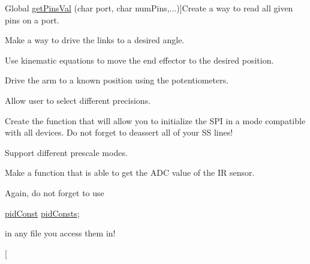 \begin{DoxyRefList}
\hypertarget{todo__todo000017}{}%
Global \hyperlink{ports_8c_ab7026077c8929553713b2884b1730e7a}{get\-Pins\-Val} (char port, char num\-Pins,...)]Create a way to read all given pins on a port.  
\item[\label{todo__todo000006}%
\hypertarget{todo__todo000006}{}%
Global \hyperlink{motors_8h_af29dc743a43c233ac843475727db132f}{goto\-Angles} (int lower\-Theta, int upper\-Theta)]Make a way to drive the links to a desired angle.  
\item[\label{todo__todo000007}%
\hypertarget{todo__todo000007}{}%
Global \hyperlink{motors_8h_aa294b49bfcc17cf4b490fb020e359851}{goto\-X\-Y} (int x, int y)]Use kinematic equations to move the end effector to the desired position.  
\item[\label{todo__todo000009}%
\hypertarget{todo__todo000009}{}%
Global \hyperlink{motors_8h_a946fb06843f118c8abacd3aef032584c}{home\-Pos} ()]Drive the arm to a known position using the potentiometers.  
\item[\label{todo__todo000001}%
\hypertarget{todo__todo000001}{}%
Global \hyperlink{_a_d_c_8c_a9c2a3351c429e7ad5ed4458495f56852}{init\-A\-D\-C} (int channel, int free, int interrupts)]Allow user to select different precisions.  
\item[\label{todo__todo000019}%
\hypertarget{todo__todo000019}{}%
Global \hyperlink{_s_p_i_8c_a070402cc6c1cae693d10f59f9c483f76}{init\-S\-P\-I} ()]Create the function that will allow you to initialize the S\-P\-I in a mode compatible with all devices. Do not forget to deassert all of your S\-S lines!  
\item[\label{todo__todo000021}%
\hypertarget{todo__todo000021}{}%
Global \hyperlink{timer_8c_a656bb5d0e209ac041910cbdbf43c7dd9}{init\-Timer} (int timer, int mode, unsigned long comp)]Support different prescale modes.  
\item[\label{todo__todo000011}%
\hypertarget{todo__todo000011}{}%
Global \hyperlink{_periph_8h_ae0fb6b592e76f0934db14682e63982df}{I\-R\-Dist} (int chan)]Make a function that is able to get the A\-D\-C value of the I\-R sensor.  
\item[\label{todo__todo000015}%
\hypertarget{todo__todo000015}{}%
Global \hyperlink{_p_i_d_8c_a4d2fc78b5924045bcc0e20fc95e18d97}{pid\-Consts} ]Again, do not forget to use
\begin{DoxyCode}
\hyperlink{structpid_const}{pidConst} \hyperlink{_p_i_d_8h_a4d2fc78b5924045bcc0e20fc95e18d97}{pidConsts}; 
\end{DoxyCode}
 in any file you access them in!  
\item[\label{todo__todo000025}%

\end{DoxyRefList}

